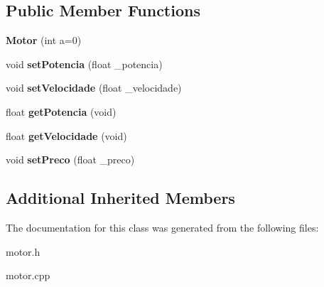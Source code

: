 \subsection*{Public Member Functions}
\begin{DoxyCompactItemize}
\item 
{\bfseries Motor} (int a=0)\hypertarget{class_motor_aa58ec792ec679b65913fec8619c5b9a2}{}\label{class_motor_aa58ec792ec679b65913fec8619c5b9a2}

\item 
void {\bfseries set\+Potencia} (float \+\_\+potencia)\hypertarget{class_motor_a9645ab1aa21f935db82717e047033d18}{}\label{class_motor_a9645ab1aa21f935db82717e047033d18}

\item 
void {\bfseries set\+Velocidade} (float \+\_\+velocidade)\hypertarget{class_motor_ac6abdb449f25131945ebe8c5a956445f}{}\label{class_motor_ac6abdb449f25131945ebe8c5a956445f}

\item 
float {\bfseries get\+Potencia} (void)\hypertarget{class_motor_a12bad50ec5ee50acaa9cfb1b63ab6726}{}\label{class_motor_a12bad50ec5ee50acaa9cfb1b63ab6726}

\item 
float {\bfseries get\+Velocidade} (void)\hypertarget{class_motor_a4da30fbd331875abe0cd1e158abdaf7c}{}\label{class_motor_a4da30fbd331875abe0cd1e158abdaf7c}

\item 
void {\bfseries set\+Preco} (float \+\_\+preco)\hypertarget{class_motor_ae13463bc31cba6521915af21b8bc01f9}{}\label{class_motor_ae13463bc31cba6521915af21b8bc01f9}

\end{DoxyCompactItemize}
\subsection*{Additional Inherited Members}


The documentation for this class was generated from the following files\+:\begin{DoxyCompactItemize}
\item 
motor.\+h\item 
motor.\+cpp\end{DoxyCompactItemize}
